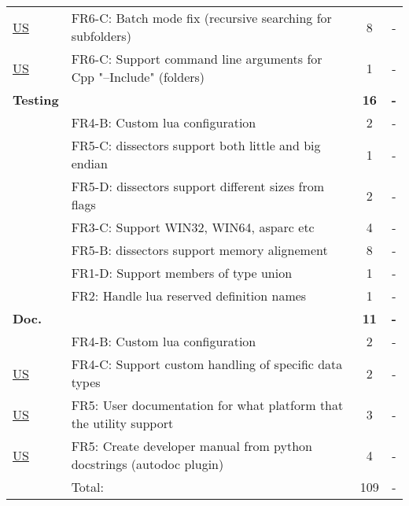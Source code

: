 \begin{table}[!htb]
\begin{tabularx}{\textwidth}{l X c c}
	\hyperref[tab:req:stories]{US} & FR6-C: Batch mode fix (recursive searching for subfolders) &  8  & - \\
	\hyperref[tab:req:stories]{US} & FR6-C: Support command line arguments for Cpp "--Include" (folders) & 1 & - \\
	\addlinespace
	\textbf{Testing} &  & \textbf{16} & \textbf{-} \\
	 & FR4-B: Custom \Gls{lua} configuration & 2 & - \\
	 & FR5-C: \Glspl{dissector} support both little and big \gls{endian} & 1 & - \\
	 & FR5-D: \Glspl{dissector} support different sizes from flags & 2 & - \\
	 & FR3-C: Support WIN32, WIN64, \gls{asparc} etc & 4 & - \\
	 & FR5-B: \Glspl{dissector} support memory alignement & 8 & - \\
	 & FR1-D: Support members of type \gls{union} & 1 & - \\
	 & FR2: Handle \Gls{lua} reserved definition names & 1 & - \\
	\addlinespace
	\textbf{Doc.} &  & \textbf{11} & \textbf{-} \\
	 & FR4-B: Custom \Gls{lua} configuration & 2 & - \\
	\hyperref[tab:req:stories]{US} & FR4-C: Support custom handling of specific data types & 2 & - \\
	\hyperref[tab:req:stories]{US} & FR5: User documentation for what platform that the \gls{utility} support & 3 & - \\
	\hyperref[tab:req:stories]{US} & FR5: Create developer manual from python docstrings (autodoc plugin) & 4 & - \\
	\midrule
	& Total: & 109 &  -\\
	\bottomrule
\end{tabularx}
\end{table}


